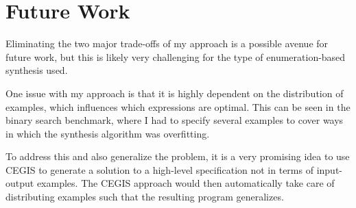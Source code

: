 \documentclass{article}
\begin{document}
\section{Future Work}
Eliminating the two major trade-offs of my approach is a possible
avenue for future work, but this is likely very challenging
for the type of enumeration-based synthesis used.

One issue with my approach is that it is highly dependent on the
distribution of examples, which influences which expressions are
optimal. This can be seen in the binary search benchmark, where I
had to specify several examples to cover ways in which the synthesis
algorithm was overfitting.

To address this and also generalize the problem, it is a very
promising idea to use CEGIS to generate a solution to a high-level
specification not in terms of input-output examples.
The CEGIS approach would then automatically take care of distributing
examples such that the resulting program generalizes.
\end{document}
